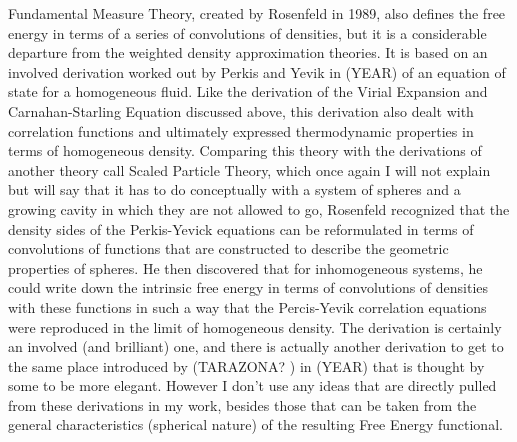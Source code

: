 Fundamental Measure Theory, created by Rosenfeld in 1989, also defines the free energy in terms of a series of convolutions of densities, but it is a considerable departure from the weighted density approximation theories.  It is based on an involved derivation worked out by Perkis and Yevik in (YEAR) of an equation of state for a homogeneous fluid.   Like the derivation of the Virial Expansion and Carnahan-Starling Equation discussed above, this derivation also dealt with correlation functions and ultimately expressed thermodynamic properties in terms of homogeneous density.  Comparing this theory with the derivations of another theory call Scaled
Particle Theory, which once again I will not explain but will say
that it has to do conceptually with a system of spheres and a growing cavity in which they are not allowed to go, Rosenfeld recognized that the density sides of the Perkis-Yevick 
equations can be reformulated in terms of convolutions
of functions that are constructed to describe the geometric
properties of spheres.  He then discovered that for inhomogeneous
systems, he could write down the intrinsic free energy in terms of
convolutions of densities with these functions in such a way
that the Percis-Yevik correlation equations were reproduced in the limit of homogeneous density.  The derivation is certainly an involved (and brilliant) one, and there is actually another derivation to get to the same place introduced by (TARAZONA? ) in (YEAR) that is thought by some to be more elegant.  However I don't use any ideas that are directly pulled from these derivations in my work, besides those that can be taken from the general characteristics (spherical nature) of the resulting Free Energy functional.   

